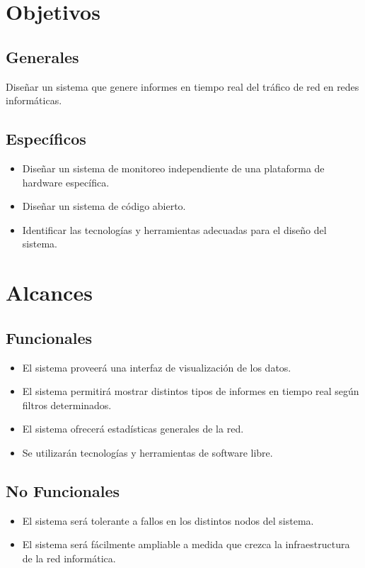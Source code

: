 \section*{Objetivos}
\subsection*{Generales}
Diseñar un sistema que genere informes en tiempo real del tráfico de red en redes informáticas.
\subsection*{Específicos}
\begin{itemize}
\item Diseñar un sistema de monitoreo independiente de una plataforma de hardware específica.
\item Diseñar un sistema de código abierto.
\item Identificar las tecnologías y herramientas adecuadas para el diseño del sistema.
\end{itemize}

\section*{Alcances}

\subsection*{Funcionales}
\begin{itemize}
	\item El sistema proveerá una interfaz de visualización de los datos.
	\item El sistema permitirá mostrar distintos tipos de informes en tiempo real según filtros determinados.
	\item El sistema ofrecerá estadísticas generales de la red.
	\item Se utilizarán tecnologías y herramientas de software libre.
\end{itemize}

\subsection*{No Funcionales}
\begin{itemize}
	\item El sistema será tolerante a fallos en los distintos nodos del sistema.
	\item El sistema será fácilmente ampliable a medida que crezca la infraestructura de la red informática.
\end{itemize}

